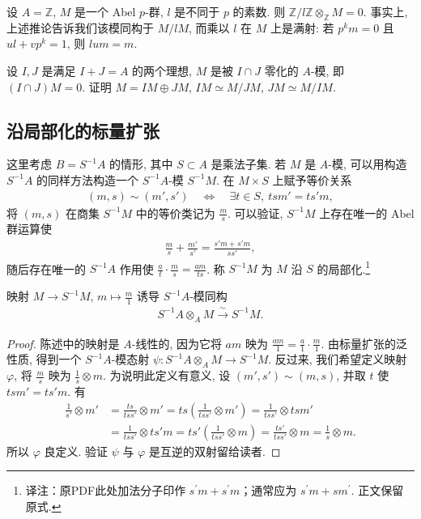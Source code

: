 \begin{example*}
设 $A=\mathbb Z$, $M$ 是一个 Abel $p$-群, $l$ 是不同于 $p$ 的素数. 则 $\mathbb Z/l\mathbb Z\otimes_{\mathbb Z}M=0$. 事实上, 上述推论告诉我们该模同构于 $M/lM$, 而乘以 $l$ 在 $M$ 上是满射: 若 $p^km=0$ 且 $ul+vp^k=1$, 则 $lum=m$.
\end{example*}
\begin{exercise*}
设 $I,J$ 是满足 $I+J=A$ 的两个理想, $M$ 是被 $I\cap J$ 零化的 $A$-模, 即 $(I\cap J)M=0$. 证明 $M=IM\oplus JM$, $IM\simeq M/JM$, $JM\simeq M/IM$.
\end{exercise*}


\subsection{沿局部化的标量扩张}\label{sec:galois-1-8-9}
这里考虑 $B=S^{-1}A$ 的情形, 其中 $S\subset A$ 是乘法子集. 若 $M$ 是 $A$-模, 可以用构造 $S^{-1}A$ 的同样方法构造一个 $S^{-1}A$-模 $S^{-1}M$. 在 $M\times S$ 上赋予等价关系
\begin{align*}
(m,s)\sim(m',s')\quad\Longleftrightarrow\quad\exists t\in S,\ tsm'=ts'm,
\end{align*}
将 $(m,s)$ 在商集 $S^{-1}M$ 中的等价类记为 $\frac ms$. 可以验证, $S^{-1}M$ 上存在唯一的 Abel 群运算使
\begin{align*}
\frac ms+\frac{m'}{s'}=\frac{s'm+s'm}{ss'},
\end{align*}
随后存在唯一的 $S^{-1}A$ 作用使 $\frac at\cdot\frac ms=\frac{am}{ts}$. 称 $S^{-1}M$ 为 $M$ 沿 $S$ 的局部化.\footnote{译注：原PDF此处加法分子印作 $s^{\prime}m+s^{\prime}m$；通常应为 $s^{\prime}m+sm^{\prime}$. 正文保留原式.}
\begin{proposition*}
映射 $M\longrightarrow S^{-1}M$, $m\mapsto\frac m1$ 诱导 $S^{-1}A$-模同构
\begin{align*}
S^{-1}A\otimes_A M\xrightarrow{\sim}S^{-1}M.
\end{align*}
\end{proposition*}
\begin{proof}
陈述中的映射是 $A$-线性的, 因为它将 $am$ 映为 $\frac{am}1=\frac a1\cdot\frac m1$. 由标量扩张的泛性质, 得到一个 $S^{-1}A$-模态射 $\psi:S^{-1}A\otimes_A M\longrightarrow S^{-1}M$. 反过来, 我们希望定义映射 $\varphi$, 将 $\frac ms$ 映为 $\frac1s\otimes m$. 为说明此定义有意义, 设 $(m',s')\sim(m,s)$, 并取 $t$ 使 $tsm'=ts'm$. 有
\begin{align*}
\frac1{s'}\otimes m'&=\frac{ts}{tss'}\otimes m'=ts\left(\frac1{tss'}\otimes m'\right)
=\frac1{tss'}\otimes tsm'\\
&=\frac1{tss'}\otimes ts'm=ts'\left(\frac1{tss'}\otimes m\right)
=\frac{ts'}{tss'}\otimes m=\frac1s\otimes m.
\end{align*}
所以 $\varphi$ 良定义. 验证 $\psi$ 与 $\varphi$ 是互逆的双射留给读者.
\end{proof}
